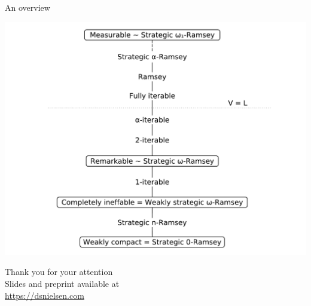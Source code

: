 \documentclass{beamer}
\begin{document}
\begin{frame}{An overview}
  \begin{center}
    \includegraphics[scale=0.48]{gfx/diagram.pdf}
  \end{center}
\end{frame}

\begin{frame}{}
  \begin{center}
    {\Large Thank you for your attention}\\\vspace{1.5cm}
    Slides and preprint available at\\
    \url{https://dsnielsen.com}
  \end{center}
\end{frame}
\end{document}

